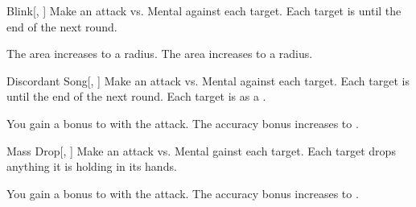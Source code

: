 \lowercase{\hypertarget{spell:Blink}{}}\label{spell:Blink}
\begin{freeability}[Rank 4]{\hypertarget{spell:Blink}{Blink}}[, ]
Make an attack vs. Mental against each target.
\hit Each target is  until the end of the next round.

\rankline
{} The area increases to a \areamed radius.
 The area increases to a \arealarge radius.

\end{freeability}
\vspace{0.25em}



\lowercase{\hypertarget{spell:Discordant Song}{}}\label{spell:Discordant Song}
\begin{freeability}[Rank 4]{\hypertarget{spell:Discordant Song}{Discordant Song}}[, ]
Make an attack vs. Mental against each target.
\hit Each target is \disoriented until the end of the next round.
\crit Each target is  as a .

\rankline
{} You gain a  bonus to  with the attack.
 The accuracy bonus increases to .

\end{freeability}
\vspace{0.25em}



\lowercase{\hypertarget{spell:Mass Drop}{}}\label{spell:Mass Drop}
\begin{freeability}[Rank 4]{\hypertarget{spell:Mass Drop}{Mass Drop}}[, ]
Make an attack vs. Mental gainst each target.
\hit Each target drops anything it is holding in its hands.

\rankline
{} You gain a  bonus to  with the attack.
 The accuracy bonus increases to .

\end{freeability}
\vspace{0.25em}



